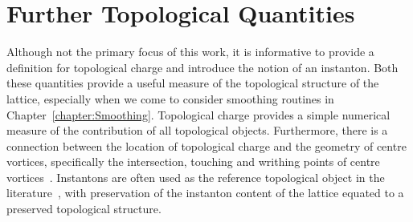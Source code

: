 \section{Further Topological Quantities}
Although not the primary focus of this work, it is informative to  provide a definition for topological charge and introduce the notion of an instanton. Both these quantities provide a useful measure of the topological structure of the lattice, especially when we come to consider smoothing routines in Chapter~\ref{chapter:Smoothing}. Topological charge provides a simple numerical measure of the contribution of all topological objects. Furthermore, there is a connection between the location of topological charge and the geometry of centre vortices, specifically the intersection, touching and writhing points of centre vortices~\cite{Spengler:2018dxt,Reinhardt:2001kf}. Instantons are often used as the reference topological object in the literature~\cite{Moran:2008ra,Trewartha:2015ida}, with preservation of the instanton content of the lattice equated to a preserved topological structure.

